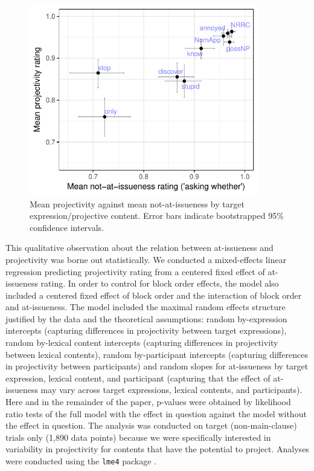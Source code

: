 \documentclass[11pt,fleqn]{article}
\newcommand{\6}{\mbox{$[\hspace*{-.6mm}[$}}
\newcommand{\9}{\mbox{$]\hspace*{-.6mm}]$}}
\begin{document}
\begin{figure}[!h]

\begin{center}
\includegraphics[width=10cm]{../results/exp1a/graphs/ai-proj-bytrigger-labels}
\end{center}

\caption{Mean projectivity against mean not-at-issueness by target expression/projective content. Error bars indicate bootstrapped 95\% confidence intervals.}
\label{fig:f-proj-ai-1a}
\end{figure}

This qualitative observation about the relation between at-issueness and projectivity was borne out statistically. We conducted a mixed-effects linear regression predicting projectivity rating from a centered fixed effect of at-issueness rating. In order to control for block order effects, the model also included a centered fixed effect of block order and the interaction of block order and at-issueness. The model included the maximal random effects structure justified by the data and the theoretical assumptions: random by-expression intercepts (capturing differences in projectivity between target expressions),  random by-lexical content intercepts (capturing differences in projectivity between lexical contents), random by-participant intercepts (capturing differences in projectivity between participants) and random slopes for at-issueness by target expression, lexical content, and participant (capturing that the effect of at-issueness may vary across target expressions, lexical contents, and participants). Here and in the remainder of the paper, p-values were obtained by likelihood ratio tests of the full model with the effect in question against the model without the effect in question. The analysis was conducted on target (non-main-clause) trials only (1,890 data points) because we were specifically interested in variability in projectivity for contents that have the potential to project. Analyses were conducted using the \verb|lme4| package \citep{bates2015}.
\end{document}
